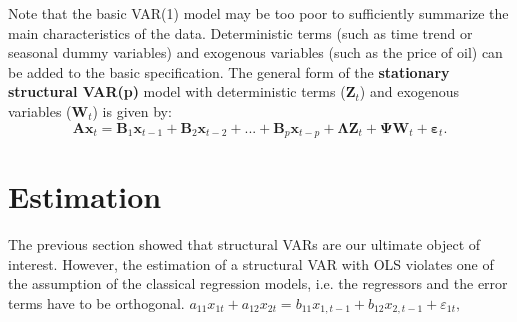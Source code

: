 \documentclass[11pt,a4paper]{report}
\numberwithin{equation}{chapter}
\numberwithin{section}{chapter}
\begin{document}
\noindent Note that the basic VAR(1) model may be too poor to sufficiently
summarize the main characteristics of the data. Deterministic terms (such as
time trend or seasonal dummy variables) and exogenous variables (such as the
price of oil) can be added to the basic specification. The general form of
the \textbf{stationary structural VAR(p)} model with deterministic terms ($%
\mathbf{Z}_{t}$) and exogenous variables ($\mathbf{W}_{t}$) is given by:%
\begin{equation*}
\mathbf{Ax}_{t}=\mathbf{B}_{1}\mathbf{x}_{t-1}+\mathbf{B}_{2}\mathbf{x}%
_{t-2}+...+\mathbf{B}_{p}\mathbf{x}_{t-p}+\boldsymbol{\Lambda }\mathbf{Z}%
_{t}+\boldsymbol{\Psi }\mathbf{W}_{t}+\mathbf{\varepsilon }_{t}.
\end{equation*}

\section{Estimation}

The previous section showed that structural VARs are our ultimate object of
interest. However, the estimation of a structural VAR with OLS violates one
of the assumption of the classical regression models, i.e. the regressors
and the error terms have to be orthogonal. $%
a_{11}x_{1t}+a_{12}x_{2t}=b_{11}x_{1,t-1}+b_{12}x_{2,t-1}+\varepsilon _{1t},$
\end{document}
